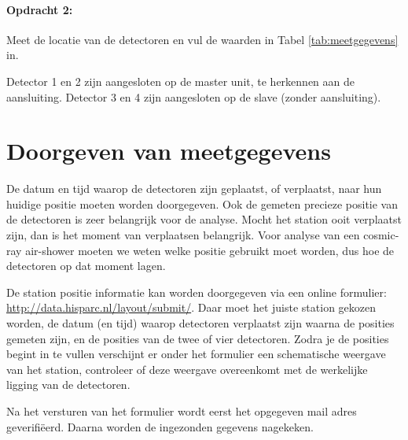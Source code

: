 \paragraph{Opdracht 2:}

Meet de locatie van de detectoren en vul de waarden in Tabel
\ref{tab:meetgegevens} in.

Detector 1 en 2 zijn aangesloten op de \hisparc master unit, te herkennen aan
de \gps aansluiting. Detector 3 en 4 zijn aangesloten op de \hisparc slave
(zonder \gps aansluiting).


\section{Doorgeven van meetgegevens}

De datum en tijd waarop de detectoren zijn geplaatst, of verplaatst,
naar hun huidige positie moeten worden doorgegeven. Ook de gemeten
precieze positie van de detectoren is zeer belangrijk voor de analyse.
Mocht het station ooit verplaatst zijn, dan is het moment van
verplaatsen belangrijk. Voor analyse van een cosmic-ray air-shower
moeten we weten welke positie gebruikt moet worden, dus hoe de
detectoren op dat moment lagen.

De station positie informatie kan worden doorgegeven via een online
formulier: \url{http://data.hisparc.nl/layout/submit/}. Daar moet het
juiste station gekozen worden, de datum (en tijd) waarop detectoren
verplaatst zijn waarna de posities gemeten zijn, en de posities van de
twee of vier detectoren. Zodra je de posities begint in te vullen
verschijnt er onder het formulier een schematische weergave van het
station, controleer of deze weergave overeenkomt met de werkelijke
ligging van de detectoren.

Na het versturen van het formulier wordt eerst het opgegeven mail adres
geverifiëerd. Daarna worden de ingezonden gegevens nagekeken.



